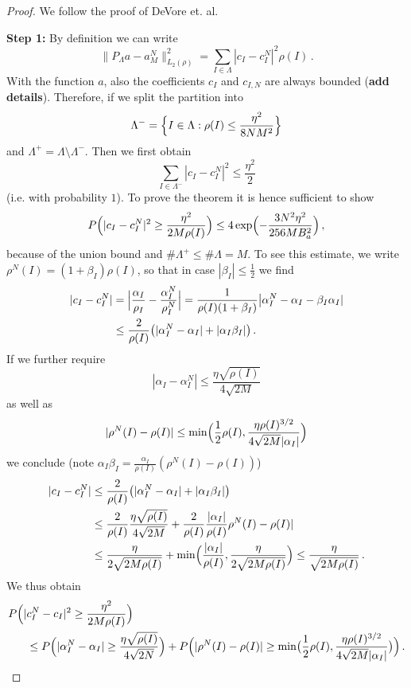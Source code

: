 \documentclass[A4paper,11pt]{article}
\theoremstyle{definition}
\begin{document}
\begin{proof}
	We follow the proof of DeVore et. al.
	
	{\bf Step 1:} By definition we can write
	\[
		\|P_\Lambda a-a^N_M\|^2_{L_2(\rho)}
			=\sum_{I\in\Lambda}|c_I-c^N_I|^2\rho(I)\,.
	\]
	With the function $a$, also the coefficients $c_I$ and $c_{I,N}$ are always bounded ({\bf add details}). Therefore,
	if we split the partition into
	\[
		\Lambda^-=\Bigl\{I\in\Lambda:\rho(I)\leq\frac{\eta^2}{8NM^2}\Bigr\}
	\]
	and $\Lambda^+=\Lambda\setminus\Lambda^-$. Then we first obtain
	\[
		\sum_{I\in\Lambda^-}|c_I-c^N_I|^2\leq\frac{\eta^2}{2}
	\]
	(i.e. with probability $1$). To prove the theorem it is hence sufficient to show
	\[
		P\Bigl(|c_I-c^N_I|^2\geq\frac{\eta^2}{2M\rho(I)}\Bigr)
			\leq 4\exp\Bigl(-\frac{3N^2\eta^2}{256MB_a^2}\Bigr)\,,
	\]
	because of the union bound and $\#\Lambda^+\leq\#\Lambda=M$. To see this estimate, we write
	$\rho^N(I)=(1+\beta_I)\rho(I)$, so that in case $|\beta_I|\leq\frac{1}{2}$ we find
	\begin{align*}
		|c_I-c^N_I|
			&=\Bigl|\frac{\alpha_I}{\rho_I}-\frac{\alpha^N_I}{\rho^N_I}\Bigr|
				=\frac{1}{\rho(I)(1+\beta_I)}\bigl|\alpha^N_I-\alpha_I-\beta_I\alpha_I|\\
			&\leq\frac{2}{\rho(I)}\bigl(|\alpha^N_I-\alpha_I|+|\alpha_I\beta_I|\bigr)\,.
	\end{align*}
	If we further require
	\[
		|\alpha_I-\alpha^N_I|\leq\frac{\eta\sqrt{\rho(I)}}{4\sqrt{2M}}
	\]
	as well as
	\[
		|\rho^N(I)-\rho(I)|\leq\min\Bigl(\frac{1}{2}\rho(I),\frac{\eta\rho(I)^{3/2}}{4\sqrt{2M}|\alpha_I|}\Bigr)
	\]
	we conclude (note $\alpha_I\beta_I=\frac{\alpha_I}{\rho(I)}(\rho^N(I)-\rho(I))$)
	\begin{align*}
		|c_I-c^N_I|
			&\leq\frac{2}{\rho(I)}\bigl(|\alpha^N_I-\alpha_I|+|\alpha_I\beta_I|\bigr)\\
			&\leq\frac{2}{\rho(I)}\frac{\eta\sqrt{\rho(I)}}{4\sqrt{2M}}
				+\frac{2}{\rho(I)}\frac{|\alpha_I|}{\rho(I)}\rho^N(I)-\rho(I)|\\
			&\leq\frac{\eta}{2\sqrt{2M\rho(I)}}
				+\min\Bigl(\frac{|\alpha_I|}{\rho(I)},\frac{\eta}{2\sqrt{2M\rho(I)}}\Bigr)
				\leq\frac{\eta}{\sqrt{2M\rho(I)}}\,.
	\end{align*}
	We thus obtain
	\begin{align}
		P\Bigl(|
			&c^N_I-c_I|^2\geq\frac{\eta^2}{2M\rho(I)}\Bigr)\notag\\
			\label{eq-prob-1}
			&\leq P\Bigl(|\alpha^N_I-\alpha_I|\geq\frac{\eta\sqrt{\rho(I)}}{4\sqrt{2N}}\Bigr)
				+P\Bigl(|\rho^N(I)-\rho(I)|\geq
					\min\bigl(\frac{1}{2}\rho(I),\frac{\eta\rho(I)^{3/2}}{4\sqrt{2M}|\alpha_I|}\bigr)\Bigr)\,.
	\end{align}
	

\end{proof}
\end{document}
